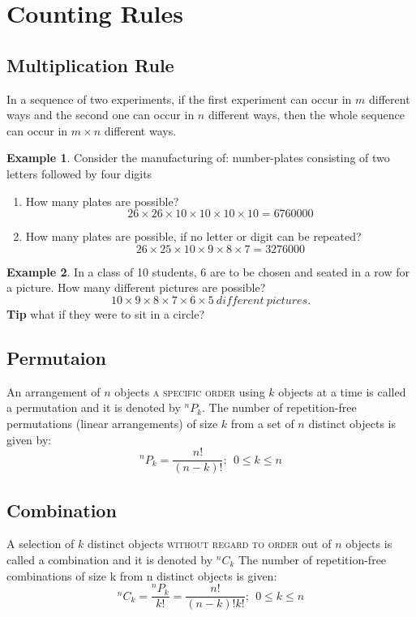 \documentclass[12pt]{article}
\theoremstyle{definition}
\newtheorem{exmp}{Example}[section]
\newcommand*{\Perm}[2]{{}^{#1}\!P_{#2}}%
\newcommand*{\Comb}[2]{{}^{#1}C_{#2}}%
\begin{document}
\section{Counting Rules}
\subsection{Multiplication Rule}
In a sequence of two experiments, if the
first experiment can occur in $m$ different
ways and the second one can occur in $n$
different ways, then the whole sequence
can occur in $m \times n$  different ways.
\begin{exmp}

    Consider the manufacturing of:
    number-plates consisting of two letters followed by four digits
    \begin{enumerate}
        \item  How many plates are possible?
            \[
                26 \times 26 \times 10 \times 10 \times 10 \times 10 = 6760000
            \]
        \item How many plates are possible, if no letter or digit can be repeated?
            \[
                26 \times 25 \times 10 \times 9 \times 8 \times 7 = 3276000 
            \]
    \end{enumerate}

\end{exmp}

\begin{exmp}
    In a class of 10 students, 6 are to be chosen and seated in a row for a
    picture.
    How many different pictures are possible?
    \[
        10 \times 9 \times 8 \times 7 \times 6 \times 5 \ different \  pictures.
    \]
    \textbf{Tip} what if they were to sit in a circle?
\end{exmp}

\subsection{Permutaion}
An arrangement of $n$ objects \textsc{ a specific order} using $k$ objects at a time is
called a permutation and it is denoted by $\Perm{n}{k}$. 
The number of repetition-free
permutations (linear arrangements) of size $k$ from a set of $n$ distinct objects
is given by:
\[
    \Perm{n}{k} = \frac{n!}{(n - k)!}; \ \ 0 \leq k \leq n
\]

\subsection{Combination}
A selection of $k$ distinct objects \textsc{without regard to order} out of $n$
objects is called a combination and it is denoted by $\Comb{n}{k} $
The number of repetition-free combinations of size k from n distinct objects is given:
\[
    \Comb{n}{k} = \frac{\Perm{n}{k}}{k!} = \frac{n!}{(n - k)!k!}; \ \  0 \leq k \leq n
\]
\end{document}
